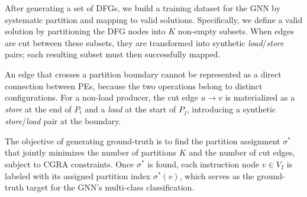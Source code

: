 \documentclass[runningheads]{llncs}
\begin{document}





After generating a set of DFGs, we build a training dataset for the GNN by systematic partition and mapping to valid solutions. Specifically, we define a valid solution by partitioning the DFG nodes into $K$ non-empty subsets. When edges are cut between these subsets, they are transformed into synthetic \textit{load}/\textit{store} pairs; each resulting subset must then successfully mapped.

An edge that crosses a partition boundary cannot be represented as a direct connection between PEs, because the two operations belong to distinct configurations. For a non-load producer, the cut edge $u \rightarrow v$ is materialized as a \textit{store} at the end of $P_i$ and a \textit{load} at the start of $P_j$, introducing a synthetic \textit{store}/\textit{load} pair at the boundary.

The objective of generating ground-truth is to find the partition assignment $\sigma^*$ that jointly minimizes the number of partitions $K$ and the number of cut edges, subject to CGRA constraints. 
Once $\sigma^*$ is found, each instruction node $v \in V_I$ is labeled with its assigned partition index $\sigma^*(v)$, which serves as the ground-truth target for the GNN's multi-class classification.
\end{document}
